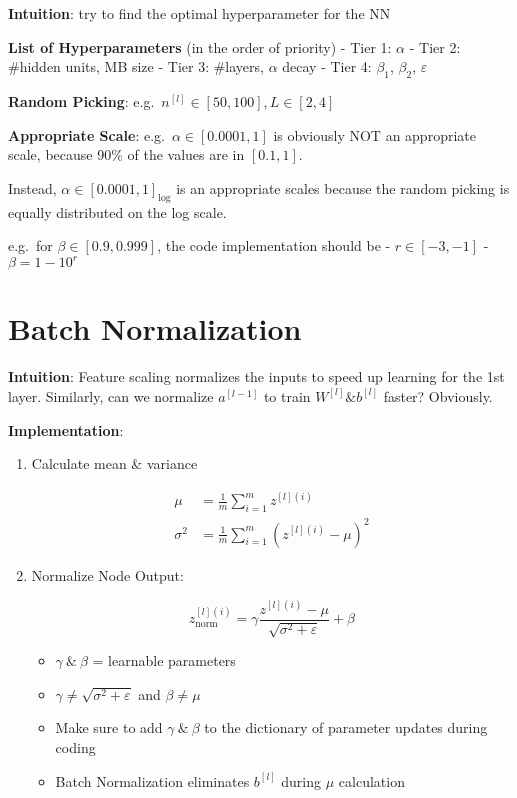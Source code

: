 \documentclass[
]{book}
\providecommand{\tightlist}{%
  \setlength{\itemsep}{0pt}\setlength{\parskip}{0pt}}
\begin{document}
\textbf{Intuition}: try to find the optimal hyperparameter for the NN

\textbf{List of Hyperparameters} (in the order of priority) - Tier 1:
\(\alpha\) - Tier 2: \#hidden units, MB size - Tier 3: \#layers,
\(\alpha\) decay - Tier 4: \(\beta_1\), \(\beta_2\), \(\varepsilon\)

\textbf{Random Picking}: e.g.~\(n^{[l]}\in [50,100], L\in [2,4]\)

\textbf{Appropriate Scale}: e.g.~\(\alpha\in [0.0001,1]\) is obviously
NOT an appropriate scale, because 90\% of the values are in \([0.1,1]\).

Instead, \(\alpha\in[0.0001,1]_ {\text{log}}\) is an appropriate scales
because the random picking is equally distributed on the log scale.

e.g.~for \(\beta\in[0.9,0.999]\), the code implementation should be -
\(r\in[-3,-1]\) - \(\beta=1-10^r\)

\hypertarget{batch-normalization}{%
\section{Batch Normalization}\label{batch-normalization}}

\textbf{Intuition}: Feature scaling normalizes the inputs to speed up
learning for the 1st layer. Similarly, can we normalize \(a^{[l-1]}\) to
train \(W^{[l]} \& b^{[l]}\) faster? Obviously.

\textbf{Implementation}:

\begin{enumerate}
\def\labelenumi{\arabic{enumi}.}
\item
  Calculate mean \& variance

  \[\begin{align}
   \mu&=\frac{1}{m}\sum_{i=1}^{m}{z^{[l](i)}} \\
   \sigma^2&=\frac{1}{m}\sum_{i=1}^{m}{(z^{[l](i)}-\mu)^2}
   \end{align}\]
\item
  Normalize Node Output:

  \[\begin{equation}
   z_{\text{norm}}^{[l](i)}=\gamma\frac{z^{[l](i)}-\mu}{\sqrt{\sigma^2+\varepsilon}}+\beta
   \end{equation}\]

  \begin{itemize}
  \tightlist
  \item
    \(\gamma\ \&\ \beta\) = learnable parameters
  \item
    \(\gamma\neq\sqrt{\sigma^2+\varepsilon}\) and \(\beta\neq\mu\)
  \item
    Make sure to add \(\gamma\ \&\ \beta\) to the dictionary of
    parameter updates during coding
  \item
    Batch Normalization eliminates \(b^{[l]}\) during \(\mu\)
    calculation
  \end{itemize}
\end{enumerate}
\end{document}
